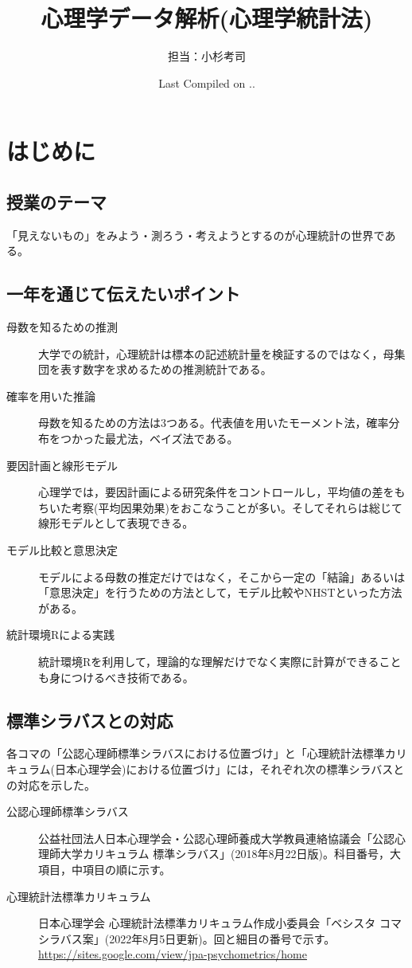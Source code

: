 \documentclass[dvipsnames]{ltjsarticle}
\begin{document}
\title{心理学データ解析(心理学統計法)}
\author{担当：小杉考司}
\date{Last Compiled on \number\year .\number\month .\number\day}
\maketitle

\setcounter{tocdepth}{1}
\newpage
\section*{はじめに}
\subsection*{授業のテーマ}

「見えないもの」をみよう・測ろう・考えようとするのが心理統計の世界である。

\subsection*{一年を通じて伝えたいポイント}
\begin{description}
	\item[母数を知るための推測] 大学での統計，心理統計は標本の記述統計量を検証するのではなく，母集団を表す数字を求めるための推測統計である。
	\item[確率を用いた推論] 母数を知るための方法は3つある。代表値を用いたモーメント法，確率分布をつかった最尤法，ベイズ法である。
	\item[要因計画と線形モデル] 心理学では，要因計画による研究条件をコントロールし，平均値の差をもちいた考察(平均因果効果)をおこなうことが多い。そしてそれらは総じて線形モデルとして表現できる。
	\item[モデル比較と意思決定] モデルによる母数の推定だけではなく，そこから一定の「結論」あるいは「意思決定」を行うための方法として，モデル比較やNHSTといった方法がある。
	\item[統計環境Rによる実践] 統計環境Rを利用して，理論的な理解だけでなく実際に計算ができることも身につけるべき技術である。
\end{description}

\subsection*{標準シラバスとの対応}
各コマの「公認心理師標準シラバスにおける位置づけ」と「心理統計法標準カリキュラム(日本心理学会)における位置づけ」には，それぞれ次の標準シラバスとの対応を示した。
\begin{description}
	\item[公認心理師標準シラバス] 公益社団法人日本心理学会・公認心理師養成大学教員連絡協議会「公認心理師大学カリキュラム 標準シラバス」(2018年8月22日版)。科目番号，大項目，中項目の順に示す。
	\item[心理統計法標準カリキュラム] 日本心理学会 心理統計法標準カリキュラム作成小委員会「ベシスタ コマシラバス案」(2022年8月5日更新)。回と細目の番号で示す。\url{https://sites.google.com/view/jpa-psychometrics/home}
\end{description}
\end{document}
